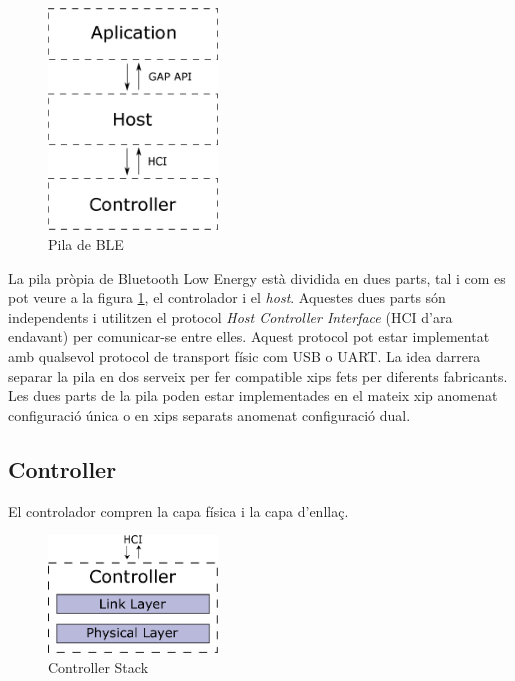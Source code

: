 \begin{figure}[h!]
	\begin{center}
		\includegraphics[width=0.4\textwidth]{./diagrames/BLE_Stack_Simplified}
		\caption{Pila de BLE}
		\label{ble_stack}
	\end{center}
\end{figure}

La pila pròpia de Bluetooth Low Energy està dividida en dues parts, tal i com es pot veure a la figura \ref{ble_stack}, el controlador i el \textit{host}. Aquestes dues parts són independents i utilitzen el protocol \textit{Host Controller Interface} (HCI d'ara endavant) per comunicar-se entre elles.
Aquest protocol pot estar implementat amb qualsevol protocol de transport físic com USB o UART.
La idea darrera separar la pila en dos serveix per fer compatible xips fets per diferents fabricants.
Les dues parts de la pila poden estar implementades en el mateix xip anomenat configuració única o en xips separats anomenat configuració dual.


\subsection{Controller}
El controlador compren la capa física i la capa d'enllaç.

\begin{figure}[h!]
	\begin{center}
		\includegraphics[width=0.4\textwidth]{./diagrames/BLE_Controller}
		\caption{Controller Stack}
	\end{center}
\end{figure}

